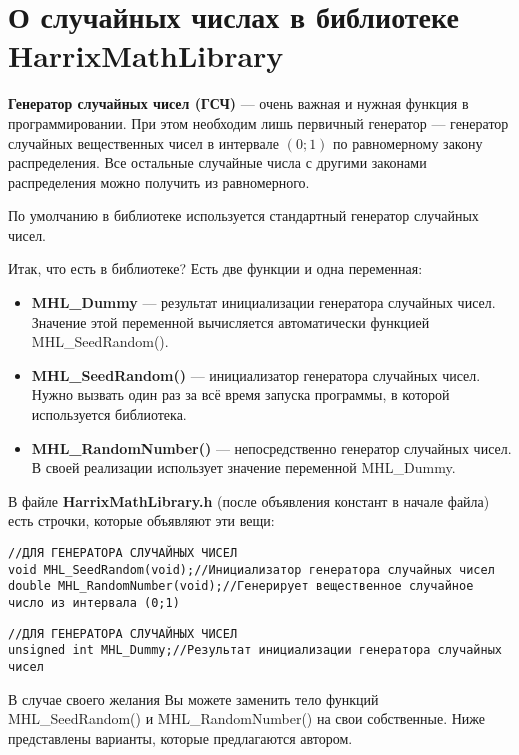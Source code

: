 \newpage
\section{О случайных числах в библиотеке HarrixMathLibrary}\label{section_random}

\textbf{Генератор случайных чисел (ГСЧ)} --- очень важная и нужная функция в программировании. При этом необходим лишь первичный генератор --- генератор случайных вещественных чисел в интервале $\left( 0; 1\right)$ по равномерному закону распределения. Все остальные случайные числа с другими законами распределения можно получить из равномерного.

По умолчанию в библиотеке используется стандартный генератор случайных чисел.


Итак, что есть в библиотеке? Есть две функции и одна переменная:
\begin{itemize}
\item \textbf{MHL\_Dummy} --- результат инициализации генератора случайных чисел. Значение этой переменной вычисляется автоматически функцией MHL\_SeedRandom().
\item \textbf{MHL\_SeedRandom()} --- инициализатор генератора случайных чисел. Нужно вызвать один раз за всё время запуска программы, в которой используется библиотека.
\item \textbf{MHL\_RandomNumber()} --- непосредственно генератор случайных чисел. В своей реализации использует значение переменной MHL\_Dummy.
\end{itemize}

В файле \textbf{HarrixMathLibrary.h} (после объявления констант в начале файла) есть строчки, которые объявляют эти вещи:
\begin{lstlisting}[label=random_h,caption=Объявление функций в HarrixMathLibrary.h]
//ДЛЯ ГЕНЕРАТОРА СЛУЧАЙНЫХ ЧИСЕЛ
void MHL_SeedRandom(void);//Инициализатор генератора случайных чисел
double MHL_RandomNumber(void);//Генерирует вещественное случайное число из интервала (0;1)
\end{lstlisting}

\begin{lstlisting}[label=random_h_cpp,caption=Объявление переменной в HarrixMathLibrary.cpp]
//ДЛЯ ГЕНЕРАТОРА СЛУЧАЙНЫХ ЧИСЕЛ
unsigned int MHL_Dummy;//Результат инициализации генератора случайных чисел
\end{lstlisting}

В случае своего желания Вы можете заменить тело функций MHL\_SeedRandom() и MHL\_RandomNumber() на свои собственные. Ниже представлены варианты, которые предлагаются автором.

